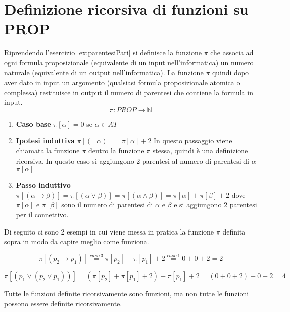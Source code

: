 \documentclass{article}
\theoremstyle{break}
\theoremstyle{break}
\theoremstyle{break}
\theoremstyle{break}
\begin{document}
\section{Definizione ricorsiva di funzioni su PROP}
\begin{definition}
	Riprendendo l'esercizio \ref{ex:parentesiPari} si definisce la funzione \( \pi \) che associa ad ogni formula
	proposizionale (equivalente di un input nell'informatica) un numero naturale
	(equivalente di un output nell'informatica). La funzione \( \pi \) quindi dopo aver dato in input
	un argomento (qualsiasi formula proposizionale atomica o complessa) restituisce in output
	il numero di parentesi che contiene la formula in input.
	\[ \pi : PROP \to \mathbb{N} \]
	\begin{enumerate}
		\item \textbf{Caso base} \( \pi [\alpha] = 0 \) se \( \alpha \in AT \)
		\item \textbf{Ipotesi induttiva} \( \pi[(\neg \alpha)] = \pi[\alpha ] + 2 \) In questo passaggio viene
		      chiamata la funzione \( \pi \) dentro la funzione \( \pi \) stessa, quindi è una definizione
		      ricorsiva. In questo caso si aggiungono 2 parentesi al numero di parentesi di \( \alpha \) \(\pi[\alpha] \)
		\item \textbf{Passo induttivo} \( \pi[(\alpha \to \beta )] = \pi[(\alpha \vee \beta)] =
		      \pi[(\alpha \wedge \beta )] = \pi[\alpha] + \pi[\beta] + 2\) dove \( \pi[\alpha ] \) e \( \pi[\beta ] \)
		      sono il numero di parentesi di \( \alpha \) e \( \beta \) e si aggiungono 2 parentesi per
		      il connettivo.
	\end{enumerate}
\end{definition}

Di seguito ci sono 2 esempi in cui viene messa in pratica la funzione \( \pi \) definita sopra in
modo da capire meglio come funziona.

\begin{example}
	\[
		\pi[(p_{2}\to p_{1})]\stackrel{caso \:3}{=}\pi[p_{2}]+\pi[p_{1}]+2\stackrel{caso \:1}{=}0+0+2=2
	\]
\end{example}
\begin{example}
	\[
		\pi[(p_{1}\vee (p_{2}\vee p_{1}))] = (\pi[p_{2}] + \pi[p_{1}] + 2) + \pi[p_{1}] + 2 = (0 + 0 + 2) + 0 + 2 = 4
	\]
\end{example}

Tutte le funzioni definite ricorsivamente sono funzioni, ma non tutte le funzioni possono essere definite ricorsivamente.
\end{document}
